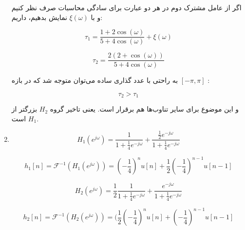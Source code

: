 \documentclass[12pt]{article}
\begin{document}
\begin{enumerate}
	اگر از عامل مشترک دوم در هر دو عبارت برای سادگی محاسبات صرف نظر کنیم و با $\xi(\omega)$ نمایش بدهیم، داریم:
	
	$$\tau_1 =\frac{1+ 2 \cos (\omega)}{5 + 4 \cos (\omega)} + \xi(\omega)$$
	
	$$\tau_2 = \frac{2(2 + \cos (\omega))}{5 + 4 \cos (\omega)}$$
		
		به راحتی با عدد گذاری ساده می‌توان متوجه شد که در بازه
		 $[-\pi,\pi]$
		 :
		 
		$$\tau_2 > \tau_1$$
		
		و این موضوع برای سایر تناوب‌ها هم برقرار است.
		یعنی تاخیر گروه $H_2$ بزرگتر از $H_1$ است.
		
		\item
		
$$H_1(e^{j\omega}) = \frac{1}{1+\frac{1}{4} e^{-j \omega}} + \frac{\frac{1}{2}e^{-j \omega}}{1 + \frac{1}{4} e^{-j\omega}}$$

$$h_1[n] = \mathcal{F}^{-1}(H_1(e^{j \omega})) = (-\frac{1}{4})^n u[n] + \frac{1}{2} (-\frac{1}{4})^{n-1}u[n-1]$$


$$H_2(e^{j\omega}) = \frac{1}{2} \frac{1}{1+\frac{1}{4}e^{-j\omega}}+\frac{e^{-j\omega}}{1+\frac{1}{4}e^{-j\omega}}$$

$$h_2[n] = \mathcal{F}^{-1}(H_2(e^{j \omega})) = (\frac{1}{2}(-\frac{1}{4})^n u[n] + (-\frac{1}{4})^{n-1}u[n-1]$$
\end{enumerate}
\end{document}
